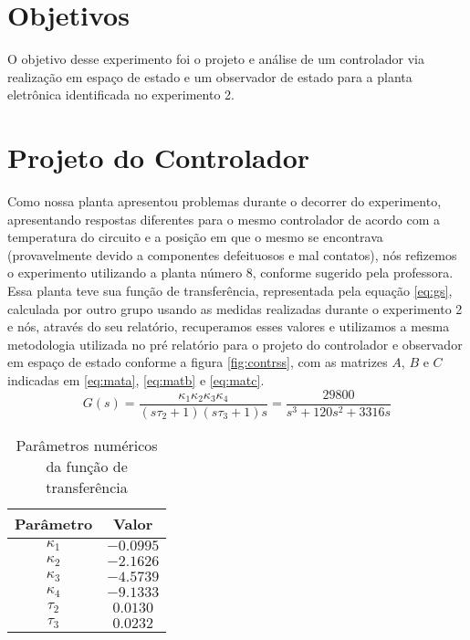 \documentclass{article}
\begin{document}


\onehalfspacing
\section{Objetivos} 
O objetivo desse experimento foi o projeto e análise de um controlador via realização em espaço de estado e um observador de estado para a planta eletrônica identificada no experimento 2\cite{bb:lab2}. 
	
\section{Projeto do Controlador}
Como nossa planta apresentou problemas durante o decorrer do experimento, apresentando respostas diferentes para o mesmo controlador de acordo com a temperatura do circuito e a posição em que o mesmo se encontrava (provavelmente devido a componentes defeituosos e mal contatos), nós refizemos o experimento utilizando a planta número 8, conforme sugerido pela professora.
Essa planta teve sua função de transferência, representada pela equação \ref{eq:gs}, calculada por outro grupo usando as medidas realizadas durante o experimento 2 e nós, através do seu relatório\cite{bb:lab2gui}, recuperamos esses valores e utilizamos a mesma metodologia utilizada no pré relatório \cite{bb:prelab6} para o projeto do controlador e observador em espaço de estado conforme a figura \ref{fig:contrss}, com as matrizes $A$, $B$ e $C$ indicadas em \ref{eq:mata}, \ref{eq:matb} e \ref{eq:matc}.\\

\begin{equation}
\label{eq:gs}
G(s) = \frac{\kappa_1\kappa_2\kappa_3\kappa_4}{(s\tau_2 + 1)(s\tau_3 + 1)s} = \frac{29800}{s^3 + 120 s^2 + 3316 s}
\end{equation}

\begin{table}[H]
	\centering
	\caption{Parâmetros numéricos da função de transferência}
	\label{tab:valores}
	\begin{tabular}{|c|c|}
		\hline Parâmetro & Valor \\ 
		\hline $\kappa_1$ & $-0.0995$\\ 
		\hline $\kappa_2$ & $-2.1626$\\ 
		\hline $\kappa_3$ & $-4.5739$\\ 
		\hline $\kappa_4$ & $-9.1333$\\ 
		\hline $\tau_2$ & $0.0130$\\ 
		\hline $\tau_3$ & $0.0232$ \\ 	
		\hline 
	\end{tabular} 
\end{table}
\end{document}
